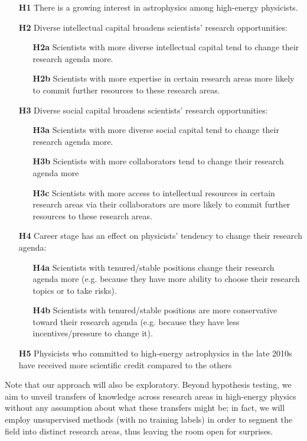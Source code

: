 \documentclass{article}
\begin{document}
\begin{itemize}
    \item[\textbf{H1}] There is a growing interest in astrophysics among high-energy physicists.
    \item[\textbf{H2}] Diverse intellectual capital broadens scientists' research opportunities:
    \begin{itemize}
        \item[\textbf{H2a}] Scientists with more diverse intellectual capital tend to change their research agenda more.
        \item[\textbf{H2b}] Scientists with more expertise in certain research areas more likely to commit further resources to these research areas.
    \end{itemize}
    \item[\textbf{H3}] Diverse social capital broadens scientists' research opportunities:
    \begin{itemize}
        \item[\textbf{H3a}] Scientists with more diverse social capital tend to change their research agenda more.
        \item[\textbf{H3b}] Scientists with more collaborators tend to change their research agenda more
        \item[\textbf{H3c}] Scientists with more access to intellectual resources in certain research areas via their collaborators are more likely to commit further resources to these research areas.
    \end{itemize}
    \item[\textbf{H4}] Career stage has an effect on physicists' tendency to change their research agenda:
    \begin{itemize}
        \item[\textbf{H4a}] Scientists with tenured/stable positions change their research agenda more (e.g. because they have more ability to choose their research topics or to take risks).
        \item[\textbf{H4b}] Scientists with tenured/stable positions are more conservative toward their research agenda (e.g. because they have less incentives/pressure to change it).
    \end{itemize}
    \item[\textbf{H5}] Physicists who committed to high-energy astrophysics in the late 2010s have received more scientific credit compared to the others
\end{itemize}

Note that our approach will also be exploratory. Beyond hypothesis testing, we aim to unveil transfers of knowledge across research areas in high-energy physics without any assumption about what these transfers might be; in fact, we will employ unsupervised methods (with no training labels) in order to segment the field into distinct research areas, thus leaving the room open for surprises.
\end{document}
